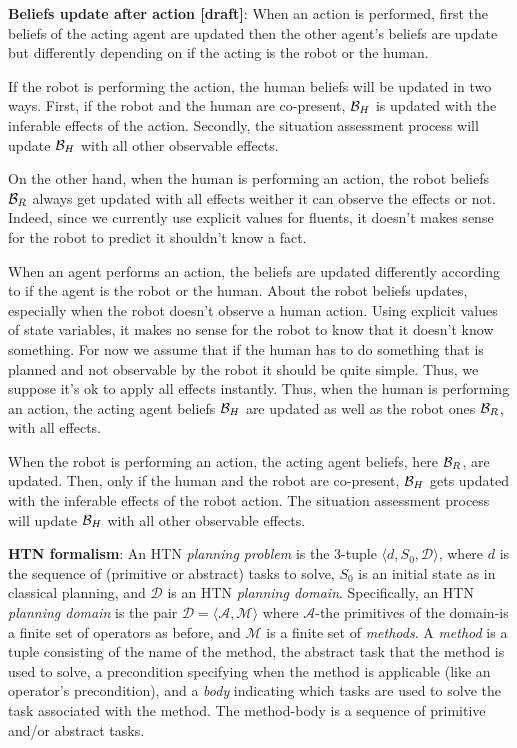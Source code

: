 \documentclass[letterpaper]{article} %
\begin{document}
\textbf{Beliefs update after action [draft]}: 
When an action is performed, first the beliefs of the acting agent are updated then the other agent's beliefs are update but differently depending on if the acting is the robot or the human. 

If the robot is performing the action, the human beliefs will be updated in two ways. First, if the robot and the human are co-present, $\mathcal{B}_H$ is updated with the inferable effects of the action. Secondly, the situation assessment process will update $\mathcal{B}_H$ with all other observable effects.

On the other hand, when the human is performing an action, the robot beliefs $\mathcal{B}_R$ always get updated with all effects weither it can observe the effects or not. 
Indeed, since we currently use explicit values for fluents, it doesn't makes sense for the robot to predict it shouldn't know a fact. 

When an agent performs an action, the beliefs are updated differently according to if the agent is the robot or the human. 
About the robot beliefs updates, especially when the robot doesn't observe a human action. Using explicit values of state variables, it makes no sense for the robot to know that it doesn't know something.
For now we assume that if the human has to do something that is planned and not observable by the robot it should be quite simple. Thus, we suppose it's ok to apply all effects instantly.
Thus, when the human is performing an action, the acting agent beliefs $\mathcal{B}_H$ are updated as well as the robot ones $\mathcal{B}_R$, with all effects.

When the robot is performing an action, the acting agent beliefs, here $\mathcal{B}_R$, are updated. Then, only if the human and the robot are co-present, $\mathcal{B}_H$ gets updated with the inferable effects of the robot action. The situation assessment process will update $\mathcal{B}_H$ with all other observable effects.

\textbf{HTN formalism}:
An HTN \textit{planning problem} is the 3-tuple $\langle d, S_0, \mathcal{D} \rangle$, where $d$ is the sequence of (primitive or abstract) tasks to solve, $S_0$ is an initial state as in classical planning, and $\mathcal{D}$ is an HTN \textit{planning domain}. Specifically, an HTN \textit{planning domain} is the pair $\mathcal{D}=\langle\mathcal{A},\mathcal{M}\rangle$ where $\mathcal{A}$-the primitives of the domain-is a finite set of operators as before, and $\mathcal{M}$ is a finite set of \textit{methods}. A \textit{method} is a tuple consisting of the name of the method, the abstract task that the method is used to solve, a precondition specifying when the method is applicable (like an operator's precondition), and a \textit{body} indicating which tasks are used to solve the task associated with the method. The method-body is a sequence of primitive and/or abstract tasks. 
\end{document}
